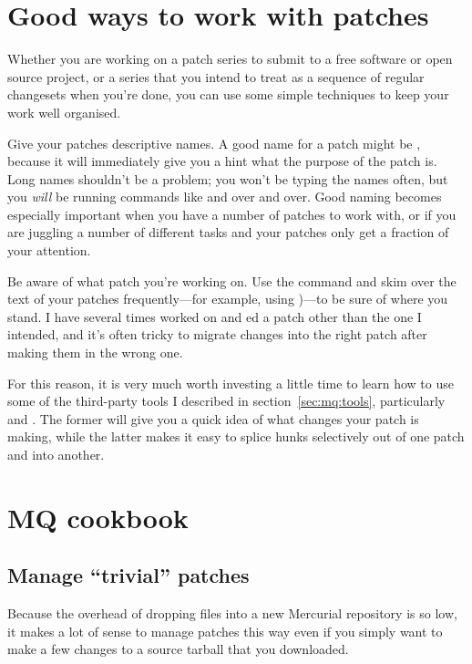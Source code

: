 \section{Good ways to work with patches}

Whether you are working on a patch series to submit to a free software
or open source project, or a series that you intend to treat as a
sequence of regular changesets when you're done, you can use some
simple techniques to keep your work well organised.

Give your patches descriptive names.  A good name for a patch might be
, because it will immediately give
you a hint what the purpose of the patch is.  Long names shouldn't be
a problem; you won't be typing the names often, but you \emph{will} be
running commands like  and  over and over.
Good naming becomes especially important when you have a number of
patches to work with, or if you are juggling a number of different
tasks and your patches only get a fraction of your attention.

Be aware of what patch you're working on.  Use the 
command and skim over the text of your patches frequently---for
example, using )---to be sure of where
you stand.  I have several times worked on and ed a
patch other than the one I intended, and it's often tricky to migrate
changes into the right patch after making them in the wrong one.

For this reason, it is very much worth investing a little time to
learn how to use some of the third-party tools I described in
section~\ref{sec:mq:tools}, particularly  and
.  The former will give you a quick idea of what
changes your patch is making, while the latter makes it easy to splice
hunks selectively out of one patch and into another.

\section{MQ cookbook}

\subsection{Manage ``trivial'' patches}

Because the overhead of dropping files into a new Mercurial repository
is so low, it makes a lot of sense to manage patches this way even if
you simply want to make a few changes to a source tarball that you
downloaded.

